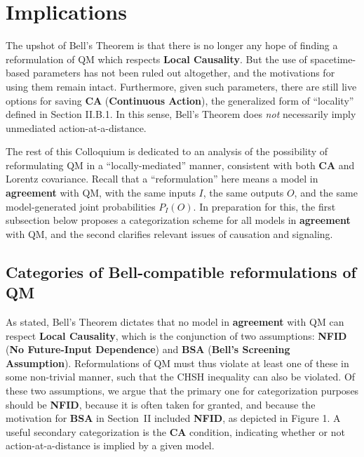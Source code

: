 \documentclass[rmp, aps, preprint, longbibliography]{revtex4-1}
\begin{document}
\section{Implications}
\label{sec:aftermath}

The upshot of Bell's Theorem is that there is no longer any hope of finding a reformulation of QM which respects {\bf Local Causality}.  But the use of spacetime-based parameters has not been ruled out altogether, and the motivations for using them remain intact.  Furthermore, given such parameters, there are still live options for saving {\bf CA} ({\bf Continuous Action}), the generalized form of ``locality'' defined in Section II.B.1.  In this sense, Bell's Theorem does {\em not} necessarily imply unmediated action-at-a-distance.

The rest of this Colloquium is dedicated to an analysis of the possibility of reformulating QM in a ``locally-mediated'' manner, consistent with both {\bf CA} and Lorentz covariance.  Recall that a ``reformulation'' here means a model in {\bf agreement} with QM, with the same inputs $I$, the same outputs $O$, and the same model-generated joint probabilities $P_I(O)$.  In preparation for this, the first subsection below proposes a categorization scheme for all models in {\bf agreement} with QM, and the second clarifies relevant issues of causation and signaling.

\subsection{Categories of Bell-compatible reformulations of QM}
\label{sec:categories}

As stated, Bell's Theorem dictates that no model in {\bf agreement} with QM can respect {\bf Local Causality}, which is the conjunction of two assumptions: {\bf NFID} ({\bf No Future-Input Dependence}) and {\bf BSA} ({\bf Bell's Screening Assumption}).  Reformulations of QM must thus violate at least one of these in some non-trivial manner, such that the CHSH inequality can also be violated.  Of these two assumptions, we argue that the primary one for categorization purposes should be {\bf NFID}, because it is often taken for granted, and because the motivation for {\bf BSA} in Section~II included {\bf NFID}, as depicted in Figure 1.  A useful secondary categorization is the {\bf CA} condition, indicating whether or not action-at-a-distance is implied by a given model.  
\end{document}

